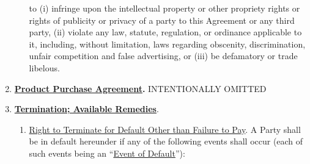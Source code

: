 \documentclass{article}
\begin{document}
\begin{enumerate}
\begin{enumerate}
    to (i) infringe upon the intellectual property or other propriety
    rights or rights of publicity or privacy of a party to this
    Agreement or any third party, (ii) violate any law, statute,
    regulation, or ordinance applicable to it, including, without
    limitation, laws regarding obscenity, discrimination, unfair
    competition and false advertising, or (iii) be defamatory or trade
    libelous.
  \end{enumerate}
\item
  \textbf{\uline{Product Purchase Agreement}.} INTENTIONALLY OMITTED
\item
  \textbf{\uline{Termination; Available Remedies}}.

  \begin{enumerate}
  \def\labelenumii{\arabic{enumii}.}
  \item
    \uline{Right to Terminate for Default Other than Failure to Pay}. A
    Party shall be in default hereunder if any of the following events
    shall occur (each of such events being an ``\uline{Event of
    Default}''):


\end{enumerate}
\end{enumerate}
\end{document}

